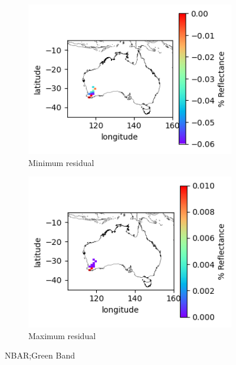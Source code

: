 \documentclass[a4paper]{article}
\begin{document}
      \begin{figure}[h!]
        \centering
          \begin{subfigure}[l]{.4\linewidth}
            \hspace{-32mm}
            \includegraphics[scale=0.9]{plots/nbar/nbar_green-MinResidual.png}
            \caption{Minimum residual}
          \end{subfigure}
%
          \begin{subfigure}[r]{.4\linewidth}
            \includegraphics[scale=0.9]{plots/nbar/nbar_green-MaxResidual.png}
            \caption{Maximum residual}
          \end{subfigure}
        \caption{NBAR;\@ Green Band}\label{figure:6}
      \end{figure}

  \clearpage
\end{document}
